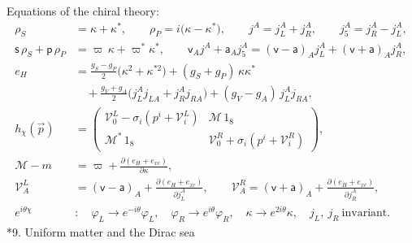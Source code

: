 \documentclass[10pt,a4paper]{article}
\makeatletter
\renewcommand\section{\@startsection{section}{1}{\z@}{-3.5ex \@plus -1ex \@minus -.2ex}{2.3ex \@plus.2ex}{\normalfont\Large\bfseries\raggedright}}
\makeatother
\begin{document}
Equations of the chiral theory:
\begin{align*}
\rho_S&=\kappa+\kappa^*,\qquad \rho_P=i\big(\kappa-\kappa^*\big),\qquad j^A=j_L^A+j_R^A,\qquad j_5^A=j_R^A-j_L^A, \\
\mathsf s\,\rho_S+\mathsf p\,\rho_P&=\varpi\,\kappa+\varpi^*\kappa^*,\qquad \mathsf v_Aj^A+\mathsf a_Aj_5^A=(\mathsf v-\mathsf a)_Aj_L^A+(\mathsf v+\mathsf a)_Aj_R^A, \\
e_H&=\frac{g_S-g_P}{2}\big(\kappa^2+\kappa^{*2}\big)+(g_S+g_P)\,\kappa\kappa^* \\
&\quad+\frac{g_V+g_A}{2}\big(j_L^Aj_{LA}+j_R^Aj_{RA}\big)+(g_V-g_A)\,j_L^Aj_{RA}, \\
h_\chi(\vec p)&=\begin{pmatrix}\mathcal V^L_0-\sigma_i(p^i+\mathcal V^L_i)&\mathcal M\,1_8\\ \mathcal M^*\,1_8&\mathcal V^R_0+\sigma_i(p^i+\mathcal V^R_i)\end{pmatrix}, \\
\mathcal M-m&=\varpi+\frac{\partial(e_H+e_{xc})}{\partial\kappa}, \\
\mathcal V^L_A&=(\mathsf v-\mathsf a)_A+\frac{\partial(e_H+e_{xc})}{\partial j_L^A},\qquad \mathcal V^R_A=(\mathsf v+\mathsf a)_A+\frac{\partial(e_H+e_{xc})}{\partial j_R^A}, \\
e^{i\theta\chi}&:\quad \varphi_L\to e^{-i\theta}\varphi_L,\quad \varphi_R\to e^{i\theta}\varphi_R,\quad \kappa\to e^{2i\theta}\kappa,\quad j_L,\ j_R\ \text{invariant}.
\end{align*}
\section*{9. Uniform matter and the Dirac sea}
\end{document}
